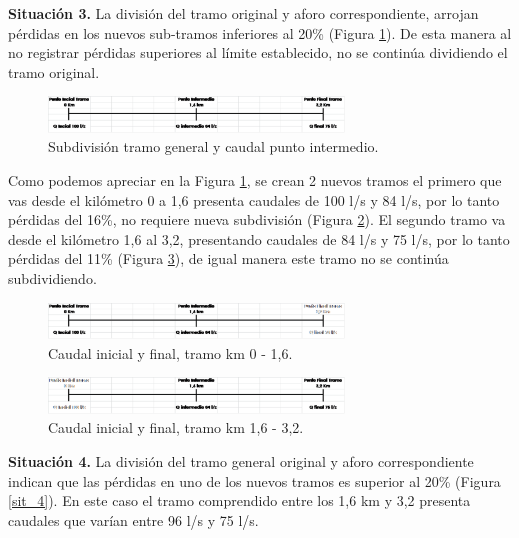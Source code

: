 \documentclass[]{article}
\begin{document}
\textbf{Situación 3.} La división del tramo original y aforo correspondiente, arrojan pérdidas en los nuevos sub-tramos inferiores al 20\% (Figura \ref{sit_3}). De esta manera al no registrar pérdidas superiores al límite establecido, no se continúa dividiendo el tramo original.\\

\begin{figure}[H]
\centering
\includegraphics[width=0.7\textwidth]{images/sit_3.eps}
\caption{Subdivisión tramo general y caudal punto intermedio.}
\label{sit_3}
\end{figure}

Como podemos apreciar en la Figura \ref{sit_3}, se crean 2 nuevos tramos  el primero que vas desde el kilómetro 0 a 1,6 presenta caudales de 100 l/s y 84 l/s, por lo tanto pérdidas del 16\%, no requiere nueva subdivisión (Figura \ref{sit_3_1}). El segundo tramo va desde el kilómetro 1,6 al 3,2, presentando caudales de 84 l/s y 75 l/s, por lo tanto pérdidas del 11\% (Figura \ref{sit_3_2}), de igual manera este tramo no se continúa subdividiendo.\\

\begin{figure}[H]
\centering
\includegraphics[width=0.7\textwidth]{images/sit_3_1.eps}
\caption{Caudal inicial y final, tramo km 0 - 1,6.}
\label{sit_3_1}
\end{figure}

\begin{figure}[H]
\centering
\includegraphics[width=0.7\textwidth]{images/sit_3_2.eps}
\caption{Caudal inicial y final, tramo km 1,6 - 3,2.}
\label{sit_3_2}
\end{figure}

\textbf{Situación 4.} La división del tramo general original y aforo correspondiente indican que las pérdidas en uno de los nuevos tramos es superior al 20\% (Figura \ref{sit_4}). En este caso el tramo comprendido entre los 1,6 km y 3,2 presenta caudales que varían entre 96 l/s y 75 l/s.\\
\end{document}

